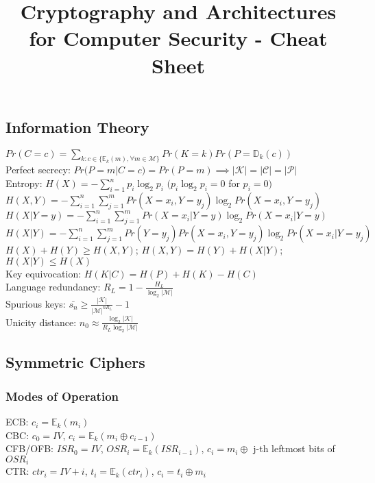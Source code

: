\documentclass[twoside, 11pt]{article}
\title{Cryptography and Architectures for Computer Security - Cheat Sheet}
\author{}
\date{}
\begin{document}
    \maketitle
        
        \subsection*{Information Theory}
            $Pr(C=c) = \sum_{k : c \in \lbrace \mathds{E}_{k}(m), \forall m \in \mathcal{M} \rbrace} Pr(K = k)Pr(P = \mathds{D}_k(c))$ \\
            Perfect secrecy: $Pr(P=m|C=c) = Pr(P=m) \implies |\mathcal{K}| = |\mathcal{C}| = |\mathcal{P}|$ \\
            Entropy: $H(X) = -\sum_{i=1}^{n} p_{i}\log_{2}p_{i}$ \quad $(p_{i}\log_{2}p_{i} = 0$ for $p_{i} = 0)$ \\
            $H(X, Y) = - \sum_{i=1}^{n} \sum_{j=1}^{m}Pr(X = x_{i}, Y = y_{j})\log_{2}Pr(X = x_{i}, Y = y_{j})$ \\
            $H(X | Y = y) = - \sum_{i=1}^{n} \sum_{j=1}^{m}Pr(X=x_{i} |Y = y)\log_{2}Pr(X = x_{i} | Y = y)$ \\
            $H(X | Y) = - \sum_{i=1}^{n} \sum_{j=1}^{m}Pr(Y = y_{j})Pr(X = x_{i}, Y=y_{j})\log_{2}Pr(X = x_{i} | Y = y_{j})$ \\
            $H(X) + H(Y) \geqslant H(X, Y)$; $H(X, Y)  = H(Y) + H(X|Y)$; $H(X|Y) \leqslant H(X)$ \\
            Key equivocation: $H(K|C) = H(P)+H(K)-H(C)$ \\
            Language redundancy: $R_{L} = 1 - \frac{H_{L}}{\log_{2}|\mathcal{M}|}$ \\
            Spurious keys: $\bar{s_{n}} \geqslant \frac{|\mathcal{K}|}{|\mathcal{M}|^{nR_{L}}}-1$ \\
            Unicity distance: $n_{0} \approx \frac{\log_{2}|\mathcal{K}|}{R_{L}\log_{2}|\mathcal{M}|}$
        
        \subsection*{Symmetric Ciphers}
            \subsubsection*{Modes of Operation}
                ECB: $c_{i} = \mathds{E}_{k}(m_{i})$ \\
                CBC: $c_{0}=IV$, $c_{i}=\mathds{E}_{k}(m_{i} \oplus c_{i-1})$ \\
                CFB/OFB: $ISR_{0}=IV$, $OSR_{i} = \mathds{E}_{k}(ISR_{i-1})$, $c_{i} = m_{i} \oplus$ j-th leftmost bits of $OSR_{i}$ \\ 
                CTR: $ctr_{i}=IV+i$, $t_{i} = \mathds{E}_{k}(ctr_{i})$, $c_{i} = t_{i} \oplus m_{i}$
            
\end{document}
